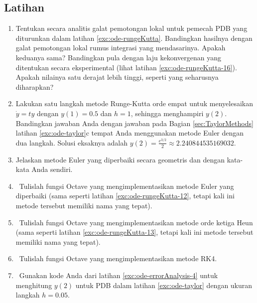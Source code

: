\subsection{Latihan}
\begin{enumerate}
\item \label{exc:ode-errorAnalysis}Tentukan secara analitis galat pemotongan
lokal untuk pemecah PDB yang diturunkan dalam latihan \vref{exc:ode-rungeKutta}.
Bandingkan hasilnya dengan galat pemotongan lokal rumus integrasi
yang mendasarinya. Apakah keduanya sama? Bandingkan pula dengan laju
kekonvergenan yang ditentukan secara eksperimental (lihat latihan
\vref{exc:ode-rungeKutta-16}). Apakah nilainya satu derajat lebih
tinggi, seperti yang seharusnya diharapkan?  \haspartwithsolution  \haspartwithanswer 
\item \label{exc:ode-errorAnalysis-1}Lakukan satu langkah metode Runge-Kutta
orde empat untuk menyelesaikan $\dot{y}=ty$ dengan $y(1)=0.5$ dan
$h=1$, sehingga menghampiri $y(2)$. Bandingkan jawaban Anda dengan
jawaban pada Bagian \ref{sec:TaylorMethods} latihan \ref{exc:ode-taylor}c
 tempat Anda menggunakan metode Euler dengan
dua langkah. Solusi eksaknya adalah $y(2)=\frac{e^{3/2}}{2}\approx2.240844535169032$. \hasasolution 
\item Jelaskan metode Euler yang diperbaiki secara geometris dan dengan
kata-kata Anda sendiri.
\item \octave\ \label{exc:ode-errorAnalysis-2}Tulislah fungsi Octave yang
mengimplementasikan metode Euler yang diperbaiki (sama seperti latihan
\vref{exc:ode-rungeKutta-12}, tetapi kali ini metode tersebut memiliki
nama yang tepat). \hasananswer 
\item \octave\ \label{exc:ode-errorAnalysis-3}Tulislah fungsi Octave yang
mengimplementasikan metode orde ketiga Heun (sama seperti latihan
\vref{exc:ode-rungeKutta-13}, tetapi kali ini metode tersebut memiliki
nama yang tepat). \hasananswer 
\item \octave\ \label{exc:ode-errorAnalysis-4}Tulislah fungsi Octave yang
mengimplementasikan metode RK4. \hasananswer 
\item \octave\ Gunakan kode Anda dari latihan \ref{exc:ode-errorAnalysis-4}
untuk menghitung $y(2)$ untuk PDB dalam latihan \ref{exc:ode-taylor}
 dengan ukuran langkah $h=0.05$.  \haspartwithsolution  \haspartwithanswer 
\end{enumerate}
\noindent\finishexercises 
